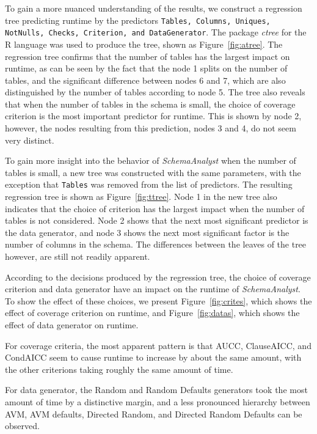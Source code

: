 To gain a more nuanced understanding of the results, we construct a regression tree predicting runtime by the predictors
\texttt{Tables, Columns, Uniques, NotNulls, Checks, Criterion, and DataGenerator}. The package \textit{ctree} for the R
language was used to produce the tree, shown as Figure~\ref{fig:atree}. The regression tree confirms that the number of
tables has the largest impact on runtime, as can be seen by the fact that the node 1 splits on the number of tables, and
the significant difference between nodes 6 and 7, which are also distinguished by the number of tables according to node
5. The tree also reveals that when the number of tables in the schema is small, the choice of coverage criterion is the
most important predictor for runtime.  This is shown by node 2, however, the nodes resulting from this prediction, nodes
3 and 4, do not seem very distinct.

To gain more insight into the behavior of \textit{SchemaAnalyst} when the number of tables is small, a new tree was
constructed with the same parameters, with the exception that \texttt{Tables} was removed from the list of predictors.
The resulting regression tree is shown as Figure~\ref{fig:ttree}.  Node 1 in the new tree also indicates that the choice
of criterion has the largest impact when the number of tables is not considered.  Node 2 shows that the next most
significant predictor is the data generator, and node 3 shows the next most significant factor is the number of columns
in the schema.  The differences between the leaves of the tree however, are still not readily apparent.

According to the decisions produced by the regression tree, the choice of coverage criterion and data generator have an
impact on the runtime of \textit{SchemaAnalyst}. To show the effect of these choices, we present
Figure~\ref{fig:crites}, which shows the effect of coverage criterion on runtime, and Figure~\ref{fig:datas}, which
shows the effect of data generator on runtime.

For coverage criteria, the most apparent pattern is that AUCC, ClauseAICC, and CondAICC seem to cause runtime to
increase by about the same amount, with the other criterions taking roughly the same amount of time.

For data generator, the Random and Random Defaults generators took the most amount of time by a distinctive margin, and
a less pronounced hierarchy between AVM, AVM defaults, Directed Random, and Directed Random Defaults can be observed.

